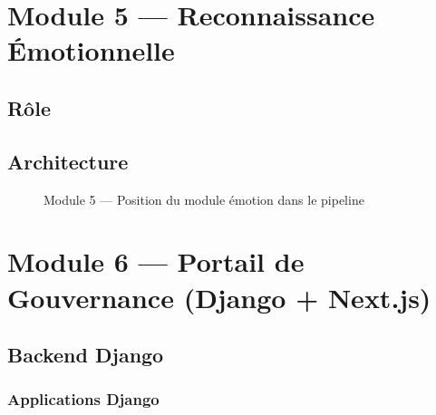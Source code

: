 \section{Module 5 — Reconnaissance Émotionnelle}

\subsection{Rôle}


\subsection{Architecture}

\begin{figure}[H]
  \centering
  
  \caption{Module 5 — Position du module émotion dans le pipeline}
  \label{fig:m5_emotion}
\end{figure}


\section{Module 6 — Portail de Gouvernance (Django + Next.js)}

\subsection{Backend Django}

\subsubsection{Applications Django}

